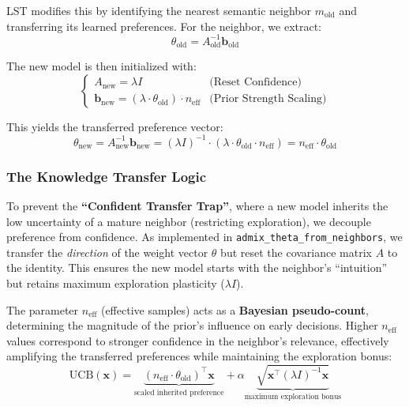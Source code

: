 \documentclass[sigconf,nonacm]{acmart}
\begin{document}
LST modifies this by identifying the nearest semantic neighbor $m_{\text{old}}$ and transferring its learned preferences. For the neighbor, we extract:
\begin{equation}
\theta_{\text{old}} = A_{\text{old}}^{-1} \mathbf{b}_{\text{old}}
\end{equation}

The new model is then initialized with:
\begin{equation}
\begin{cases}
A_{\text{new}} = \lambda I & \text{(Reset Confidence)} \\
\mathbf{b}_{\text{new}} = (\lambda \cdot \theta_{\text{old}}) \cdot n_{\text{eff}} & \text{(Prior Strength Scaling)}
\end{cases}
\end{equation}

This yields the transferred preference vector:
\begin{equation}
\theta_{\text{new}} = A_{\text{new}}^{-1} \mathbf{b}_{\text{new}} = (\lambda I)^{-1} \cdot (\lambda \cdot \theta_{\text{old}} \cdot n_{\text{eff}}) = n_{\text{eff}} \cdot \theta_{\text{old}}
\end{equation}

\subsubsection{The Knowledge Transfer Logic}

To prevent the \textbf{``Confident Transfer Trap''}, where a new model inherits the low uncertainty of a mature neighbor (restricting exploration), we decouple preference from confidence. As implemented in \texttt{admix\_theta\_from\_neighbors}, we transfer the \textit{direction} of the weight vector $\theta$ but reset the covariance matrix $A$ to the identity. This ensures the new model starts with the neighbor's ``intuition'' but retains maximum exploration plasticity ($\lambda I$). 

The parameter $n_{\text{eff}}$ (effective samples) acts as a \textbf{Bayesian pseudo-count}, determining the magnitude of the prior's influence on early decisions. Higher $n_{\text{eff}}$ values correspond to stronger confidence in the neighbor's relevance, effectively amplifying the transferred preferences while maintaining the exploration bonus:
\begin{equation}
\text{UCB}(\mathbf{x}) = \underbrace{(n_{\text{eff}} \cdot \theta_{\text{old}})^\top \mathbf{x}}_{\text{scaled inherited preference}} + \alpha \underbrace{\sqrt{\mathbf{x}^\top (\lambda I)^{-1} \mathbf{x}}}_{\text{maximum exploration bonus}}
\end{equation}
\end{document}
